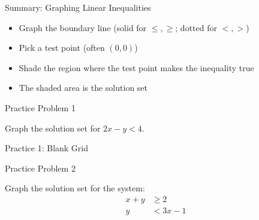 \documentclass[aspectratio=169]{beamer}
\begin{document}
\begin{frame}{Summary: Graphing Linear Inequalities}
    \begin{tcolorbox}[colback=lightgray,colframe=primary,title=Key Points]
        \footnotesize
        \begin{itemize}
            \item \textcolor{accent}{Graph the boundary line} (solid for $\leq, \geq$; dotted for $<, >$)
            \item \textcolor{accent}{Pick a test point} (often $(0,0)$)
            \item \textcolor{accent}{Shade the region} where the test point makes the inequality true
            \item \textcolor{accent}{The shaded area is the solution set}
        \end{itemize}
    \end{tcolorbox}
\end{frame}

\begin{frame}{Practice Problem 1}
    \begin{tcolorbox}[colback=lightgray,colframe=accent,title=Practice 1]
        \footnotesize
        Graph the solution set for $2x - y < 4$.
    \end{tcolorbox}
\end{frame}

\begin{frame}{Practice 1: Blank Grid}
    \begin{center}
    \end{center}
\end{frame}

\begin{frame}{Practice Problem 2}
    \begin{tcolorbox}[colback=lightgray,colframe=accent,title=Practice 2]
        \footnotesize
        Graph the solution set for the system:
        \begin{align*}
            x + y &\geq 2 \\
            y &< 3x - 1
        \end{align*}
    \end{tcolorbox}
\end{frame}
\end{document}
